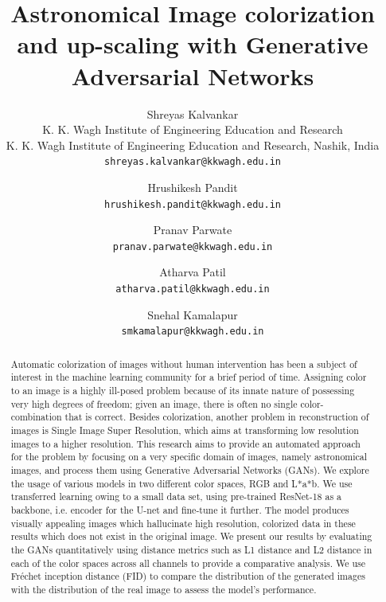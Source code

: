 \documentclass[10pt,twocolumn,letterpaper]{article}
\begin{document}
\title{Astronomical Image colorization and up-scaling with Generative Adversarial Networks}

\author{Shreyas Kalvankar\\
K. K. Wagh Institute of Engineering Education and Research\\
K. K. Wagh Institute of Engineering Education and Research, Nashik, India\\
{\tt\small shreyas.kalvankar@kkwagh.edu.in}
\and
Hrushikesh Pandit\\
{\tt\small hrushikesh.pandit@kkwagh.edu.in}
\and
Pranav Parwate\\
{\tt\small pranav.parwate@kkwagh.edu.in}
\and
Atharva Patil\\
{\tt\small atharva.patil@kkwagh.edu.in}
\and
Snehal Kamalapur\\
{\tt\small smkamalapur@kkwagh.edu.in}
}
\maketitle

\begin{abstract}
   Automatic colorization of images without human intervention has been a subject of interest in the machine learning community for a brief period of time. Assigning color to an image is a highly ill-posed problem because of its innate nature of possessing very high degrees of freedom; given an image, there is often no single color-combination that is correct. Besides colorization, another problem in reconstruction of images is Single Image Super Resolution, which aims at transforming low resolution images to a higher resolution. This research aims to provide an automated approach for the problem by focusing on a very specific domain of images, namely astronomical images, and process them using Generative Adversarial Networks (GANs). We explore the usage of various models in two different color spaces, RGB and L*a*b. We use transferred learning owing to a small data set, using pre-trained ResNet-18 as a backbone, i.e. encoder for the U-net and fine-tune it further. The model produces visually appealing images which hallucinate high resolution, colorized data in these results which does not exist in the original image. We present our results by evaluating the GANs quantitatively using distance metrics such as L1 distance and L2 distance in each of the color spaces across all channels to provide a comparative analysis. We use Fréchet inception distance (FID) to compare the distribution of the generated images with the distribution of the real image to assess the model's performance.
\end{abstract}
\end{document}
